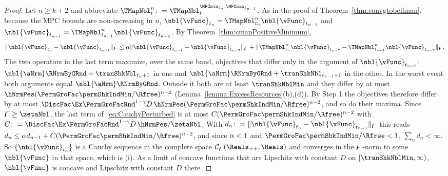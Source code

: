 \documentclass[\econtexRoot/BufferStockTheory]{subfiles}
\begin{document}
\begin{proof}
Let $n\geq k+2$ and abbreviate $\TMapNbl_{t}^{n}\colon=\TMapNbl_{t}^{\MPCmin_{t_{n}},\MPCmax_{t_{n-1}}}$.
As in the proof of Theorem~\ref{thm:convgtobellman}, because the MPC bounds are non-increasing in $n$, $\nbl{\vFunc}_{t_{n}}=\TMapNbl_{t_{n}}^{n}\nbl{\vFunc}_{t_{n-1}}$ and $\nbl{\vFunc}_{t_{n-1}}=\TMapNbl_{t_{n-1}}^{n}\nbl{\vFunc}_{t_{n-2}}$.
By Theorem~\ref{thm:cmapPositiveMinimum},
\begin{equation}\label{eq:CauchyPerturbed}
  \Vert\nbl{\vFunc}_{t_{n}}-\nbl{\vFunc}_{t_{n-1}}\Vert_{\boundFunc}
  \leq\Shrinker\Vert\nbl{\vFunc}_{t_{n-1}}-\nbl{\vFunc}_{t_{n-2}}\Vert_{\boundFunc}
  +\Vert\TMapNbl_{t_{n}}^{n}\nbl{\vFunc}_{t_{n-2}}-\TMapNbl_{t_{n-1}}^{n}\nbl{\vFunc}_{t_{n-2}}\Vert_{\boundFunc}.
\end{equation}
The two operators in the last term maximize, over the same band, objectives that differ only in the argument of $\nbl{\vFunc}_{t_{n-2}}$: $\nbl{\aNrm}\RNrmByGRnd+\tranShkNbl_{t_{n}+1}$ in one and $\nbl{\aNrm}\RNrmByGRnd+\tranShkNbl_{t_{n-1}+1}$ in the other.
In the worst event both arguments equal $\nbl{\aNrm}\RNrmByGRnd$.
Outside it both are at least $\tranShkNblMin$ and they differ by at most $\hNrmPes(\PermGroFac\permShkIndMin/\Rfree)^{n-2}$ (Lemma~\ref{lemma:ExcessResources}(b),(d)).
By Step 1 the objectives therefore differ by at most $\DiscFac\Ex\PermGroFacRnd^{1-\CRRA}D\,\hNrmPes(\PermGroFac\permShkIndMin/\Rfree)^{n-2}$, and so do their maxima.
Since $\boundFunc\geq\zetaNbl$, the last term of~\eqref{eq:CauchyPerturbed} is at most $C(\PermGroFac\permShkIndMin/\Rfree)^{n-2}$ with $C\colon=\DiscFac\Ex\PermGroFacRnd^{1-\CRRA}D\,\hNrmPes/\zetaNbl$.
With $d_{n}\colon=\Vert\nbl{\vFunc}_{t_{n}}-\nbl{\vFunc}_{t_{n-1}}\Vert_{\boundFunc}$ this reads $d_{n}\leq\Shrinker d_{n-1}+C(\PermGroFac\permShkIndMin/\Rfree)^{n-2}$, and since $\alpha<1$ and $\PermGroFac\permShkIndMin/\Rfree<1$, $\sum_{n}d_{n}<\infty$.
So $\{\nbl{\vFunc}_{t_{n}}\}$ is a Cauchy sequence in the complete space $\mathcal{C}_{\boundFunc}(\Reals_{++},\Reals)$ and converges in the $\digamma$-norm to some $\nbl{\vFunc}$ in that space, which is (i).
As a limit of concave functions that are Lipschitz with constant $D$ on $[\tranShkNblMin,\infty)$, $\nbl{\vFunc}$ is concave and Lipschitz with constant $D$ there.


\end{proof}
\end{document}
